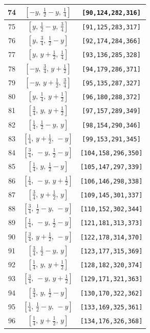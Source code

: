 \documentclass[fleqn,8pt]{jsarticle}
\begin{document}
\begin{longtable}{ccc}
74 & $\left[ - y,\, \frac{1}{2} - y,\, \frac{1}{4} \right]$ & {\tt [90,124,282,316]} \\ \hline
75 & $\left[ y,\, \frac{1}{2} - y,\, \frac{3}{4} \right]$ & {\tt [91,125,283,317]} \\ \hline
76 & $\left[ y,\, \frac{3}{4},\, \frac{1}{2} - y \right]$ & {\tt [92,174,284,366]} \\ \hline
77 & $\left[ y,\, y + \frac{1}{2},\, \frac{1}{4} \right]$ & {\tt [93,136,285,328]} \\ \hline
78 & $\left[ - y,\, \frac{3}{4},\, y + \frac{1}{2} \right]$ & {\tt [94,179,286,371]} \\ \hline
79 & $\left[ - y,\, y + \frac{1}{2},\, \frac{3}{4} \right]$ & {\tt [95,135,287,327]} \\ \hline
80 & $\left[ y,\, \frac{1}{4},\, y + \frac{1}{2} \right]$ & {\tt [96,180,288,372]} \\ \hline
81 & $\left[ \frac{3}{4},\, y,\, y + \frac{1}{2} \right]$ & {\tt [97,157,289,349]} \\ \hline
82 & $\left[ \frac{1}{4},\, \frac{1}{2} - y,\, y \right]$ & {\tt [98,154,290,346]} \\ \hline
83 & $\left[ \frac{1}{4},\, y + \frac{1}{2},\, - y \right]$ & {\tt [99,153,291,345]} \\ \hline
84 & $\left[ \frac{3}{4},\, - y,\, \frac{1}{2} - y \right]$ & {\tt [104,158,296,350]} \\ \hline
85 & $\left[ \frac{1}{4},\, y,\, \frac{1}{2} - y \right]$ & {\tt [105,147,297,339]} \\ \hline
86 & $\left[ \frac{1}{4},\, - y,\, y + \frac{1}{2} \right]$ & {\tt [106,146,298,338]} \\ \hline
87 & $\left[ \frac{3}{4},\, y + \frac{1}{2},\, y \right]$ & {\tt [109,145,301,337]} \\ \hline
88 & $\left[ \frac{3}{4},\, \frac{1}{2} - y,\, - y \right]$ & {\tt [110,152,302,344]} \\ \hline
89 & $\left[ \frac{1}{4},\, - y,\, \frac{1}{2} - y \right]$ & {\tt [121,181,313,373]} \\ \hline
90 & $\left[ \frac{3}{4},\, y + \frac{1}{2},\, - y \right]$ & {\tt [122,178,314,370]} \\ \hline
91 & $\left[ \frac{3}{4},\, \frac{1}{2} - y,\, y \right]$ & {\tt [123,177,315,369]} \\ \hline
92 & $\left[ \frac{1}{4},\, y,\, y + \frac{1}{2} \right]$ & {\tt [128,182,320,374]} \\ \hline
93 & $\left[ \frac{3}{4},\, - y,\, y + \frac{1}{2} \right]$ & {\tt [129,171,321,363]} \\ \hline
94 & $\left[ \frac{3}{4},\, y,\, \frac{1}{2} - y \right]$ & {\tt [130,170,322,362]} \\ \hline
95 & $\left[ \frac{1}{4},\, \frac{1}{2} - y,\, - y \right]$ & {\tt [133,169,325,361]} \\ \hline
96 & $\left[ \frac{1}{4},\, y + \frac{1}{2},\, y \right]$ & {\tt [134,176,326,368]} \\
\end{longtable}
\end{document}
